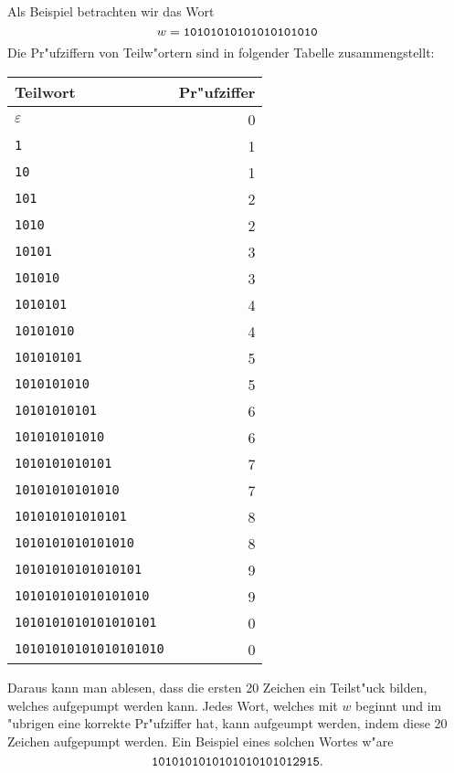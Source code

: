 {\begin{loesung}
Als Beispiel betrachten wir das Wort
\[
w=\text{\tt 10101010101010101010}
\]
Die Pr"ufziffern von Teilw"ortern sind in folgender Tabelle
zusammengstellt:
\begin{center}
\begin{tabular}{|l|r|}
\hline
Teilwort&Pr"ufziffer\\
\hline
$\varepsilon$             &0\\
{\tt 1}                   &1\\
{\tt 10}                  &1\\
{\tt 101}                 &2\\
{\tt 1010}                &2\\
{\tt 10101}               &3\\
{\tt 101010}              &3\\
{\tt 1010101}             &4\\
{\tt 10101010}            &4\\
{\tt 101010101}           &5\\
{\tt 1010101010}          &5\\
{\tt 10101010101}         &6\\
{\tt 101010101010}        &6\\
{\tt 1010101010101}       &7\\
{\tt 10101010101010}      &7\\
{\tt 101010101010101}     &8\\
{\tt 1010101010101010}    &8\\
{\tt 10101010101010101}   &9\\
{\tt 101010101010101010}  &9\\
{\tt 1010101010101010101} &0\\
{\tt 10101010101010101010}&0\\
\hline
\end{tabular}
\end{center}
Daraus kann man ablesen, dass die ersten 20 Zeichen ein Teilst"uck
bilden, welches aufgepumpt werden kann. Jedes Wort, welches mit
$w$ beginnt und im "ubrigen eine korrekte Pr"ufziffer hat, kann
aufgeumpt werden, indem diese 20 Zeichen aufgepumpt werden.
Ein Beispiel eines solchen Wortes w"are
\[
\text{\tt 1010101010101010101012915}.
\]
\end{loesung}
}{ }

